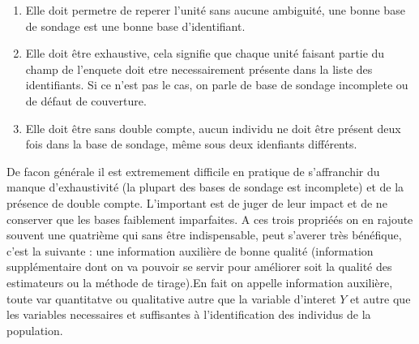 \documentclass[a4paper]{article}
\begin{document}
\begin{enumerate}
    \item Elle doit permetre de reperer l'unité sans aucune ambiguité, une bonne base de sondage est une bonne base d'identifiant.
    \item Elle doit être exhaustive, cela signifie que chaque unité faisant partie du champ de l'enquete doit etre necessairement présente dans la
        liste des identifiants. Si ce n'est pas le cas, on parle de base de sondage incomplete ou de défaut de couverture.
    \item Elle doit être sans double compte, aucun individu ne doit être présent deux fois dans la base de sondage, même sous deux idenfiants
        différents.
\end{enumerate}
De facon générale il est extremement difficile en pratique de s'affranchir du manque d'exhaustivité (la plupart des bases de sondage est incomplete) et 
de la présence de double compte. L'important est de juger de leur impact et de ne conserver que les bases faiblement imparfaites.
A ces trois propriéés on en rajoute souvent une quatrième qui sans être indispensable, peut s'averer très bénéfique, c'est la suivante : une
information auxilière de bonne qualité (information supplémentaire dont on va pouvoir se servir pour améliorer soit la qualité des estimateurs ou
la méthode de tirage).En fait on appelle information auxilière, toute var quantitatve ou qualitative autre que la variable d'interet $Y$ et autre que
les variables necessaires et suffisantes à l'identification des individus de la population.
\end{document}
